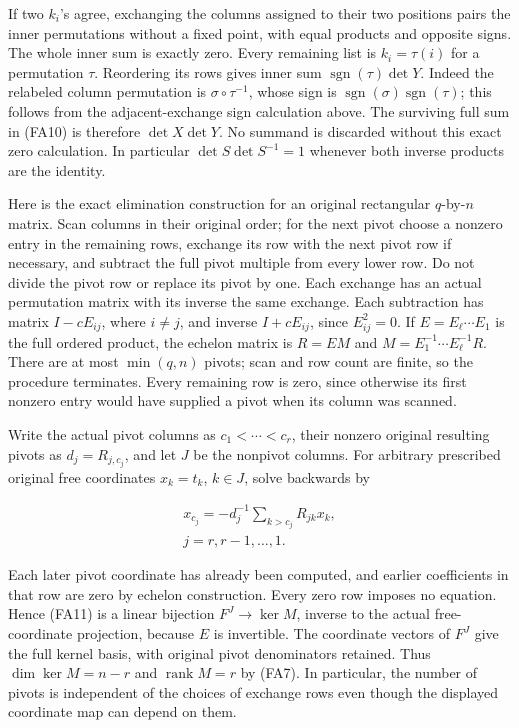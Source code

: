 \documentclass[
  11pt,
]{article}
\begin{document}
If two \(k_i\)'s agree, exchanging the columns assigned to their two
positions pairs the inner permutations without a fixed point, with equal
products and opposite signs. The whole inner sum is exactly zero. Every
remaining list is \(k_i=\tau(i)\) for a permutation \(\tau\). Reordering
its rows gives inner sum \(\operatorname{sgn}(\tau)\det Y\). Indeed the
relabeled column permutation is \(\sigma\circ\tau^{-1}\), whose sign is
\(\operatorname{sgn}(\sigma)\operatorname{sgn}(\tau)\); this follows
from the adjacent-exchange sign calculation above. The surviving full
sum in (FA10) is therefore \(\det X\det Y\). No summand is discarded
without this exact zero calculation. In particular
\(\det S\det S^{-1}=1\) whenever both inverse products are the identity.

Here is the exact elimination construction for an original rectangular
\(q\)-by-\(n\) matrix. Scan columns in their original order; for the
next pivot choose a nonzero entry in the remaining rows, exchange its
row with the next pivot row if necessary, and subtract the full pivot
multiple from every lower row. Do not divide the pivot row or replace
its pivot by one. Each exchange has an actual permutation matrix with
its inverse the same exchange. Each subtraction has matrix
\(I-cE_{ij}\), where \(i\ne j\), and inverse \(I+cE_{ij}\), since
\(E_{ij}^2=0\). If \(E=E_\ell\cdots E_1\) is the full ordered product,
the echelon matrix is \(R=EM\) and \(M=E_1^{-1}\cdots E_\ell^{-1}R\).
There are at most \(\min(q,n)\) pivots; scan and row count are finite,
so the procedure terminates. Every remaining row is zero, since
otherwise its first nonzero entry would have supplied a pivot when its
column was scanned.

Write the actual pivot columns as \(c_1<\cdots<c_r\), their nonzero
original resulting pivots as \(d_j=R_{j,c_j}\), and let \(J\) be the
nonpivot columns. For arbitrary prescribed original free coordinates
\(x_k=t_k\), \(k\in J\), solve backwards by

\[
\begin{gathered}
x_{c_j}=-d_j^{-1}\sum_{k>c_j}R_{jk}x_k, \\ j=r,r-1,\ldots,1.
\end{gathered}
\tag{FA11}
\]

Each later pivot coordinate has already been computed, and earlier
coefficients in that row are zero by echelon construction. Every zero
row imposes no equation. Hence (FA11) is a linear bijection
\(F^J\to\ker M\), inverse to the actual free-coordinate projection,
because \(E\) is invertible. The coordinate vectors of \(F^J\) give the
full kernel basis, with original pivot denominators retained. Thus
\(\dim\ker M=n-r\) and \(\operatorname{rank}M=r\) by (FA7). In
particular, the number of pivots is independent of the choices of
exchange rows even though the displayed coordinate map can depend on
them.
\end{document}
